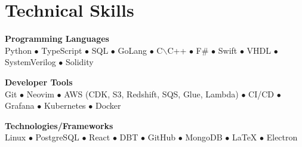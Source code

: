 \section{Technical Skills}
\begin{center}
\noindent\begin{minipage}{0.3\textwidth}
\centering
\textbf{Programming Languages}
\\
\justifying
\noindent Python $\bullet$ TypeScript $\bullet$ SQL $\bullet$ GoLang $\bullet$ C$\backslash$C++ $\bullet$ F\# $\bullet$ Swift $\bullet$ VHDL $\bullet$ SystemVerilog $\bullet$ Solidity
\end{minipage}
\hfill\vline\hfill
\noindent\begin{minipage}{0.3\textwidth}
\centering
\textbf{Developer Tools}\\
\justifying
\noindent Git $\bullet$ Neovim $\bullet$ AWS (CDK, S3, Redshift, SQS, Glue, Lambda) $\bullet$ CI/CD $\bullet$ Grafana $\bullet$ Kubernetes $\bullet$ Docker
\vspace{10pt}
\end{minipage}
\hfill\vline\hfill
\noindent\begin{minipage}{0.3\textwidth}
\centering
\textbf{Technologies/Frameworks}\\
\justifying
\noindent Linux $\bullet$ PostgreSQL $\bullet$ React $\bullet$ DBT $\bullet$ GitHub $\bullet$ MongoDB $\bullet$ LaTeX $\bullet$ Electron
\vspace{10pt}
\end{minipage}
\end{center}

